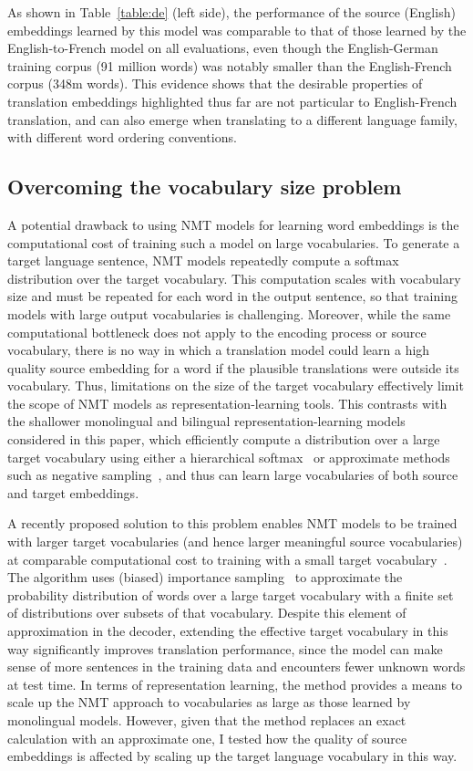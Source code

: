 As shown in Table~\ref{table:de} (left side), the performance of the source (English) embeddings learned by this model was comparable to that of those learned by the English-to-French model on all evaluations, even though the English-German training corpus (91 million words) was notably smaller than the English-French corpus (348m words). This evidence shows that the desirable properties of translation embeddings highlighted thus far are not particular to English-French translation, and can also emerge when translating to a different language family, with different word ordering conventions.     

\subsection{Overcoming the vocabulary size problem}

A potential drawback to using NMT models for learning word embeddings is the computational cost of training such a model on large vocabularies. To generate a target language sentence, NMT models repeatedly compute a softmax distribution over the target vocabulary. This computation scales with vocabulary size and must be repeated for each word in the output sentence, so that training models with large output vocabularies is challenging. Moreover, while the same computational bottleneck does not apply to the encoding process or source vocabulary, there is no way in which a translation model could learn a high quality source embedding for a word if the plausible translations were outside its vocabulary. Thus, limitations on the size of the target vocabulary effectively limit the scope of NMT models as representation-learning tools. This contrasts with the shallower monolingual and bilingual representation-learning models considered in this paper,  which efficiently compute a distribution over a large target vocabulary using either a hierarchical softmax~\citep{morin2005hierarchical} or approximate methods such as negative sampling~\citep{mikolov2013distributed,Hermann:2014:ICLR}, and thus can learn large vocabularies of both source and target embeddings.

A recently proposed solution to this problem enables NMT models to be trained with larger target vocabularies (and hence larger meaningful source vocabularies) at comparable computational cost to training with a small target vocabulary~\citep{Jean}. The algorithm uses (biased) importance sampling~\citep{Bengio+Senecal-2003-small} to approximate the probability distribution of words over a large target vocabulary with a finite set of distributions over subsets of that vocabulary. Despite this element of approximation in the decoder, extending the effective target vocabulary in this way significantly improves translation performance, since the model can make sense of more sentences in the training data and encounters fewer unknown words at test time. In terms of representation learning, the method provides a means to scale up the NMT approach to vocabularies as large as those learned by monolingual models. However, given that the method replaces an exact calculation with an approximate one, I tested how the quality of source embeddings is affected by scaling up the target language vocabulary in this way. 

